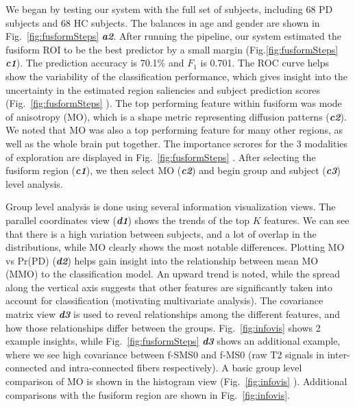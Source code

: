 We began by testing our system with the full set of subjects, including 68 PD subjects and 68 HC subjects. The balances in age and gender are shown in Fig.~\ref{fig:fusformSteps} \textbf{\textit{a2}}. After running the pipeline, our system estimated the fusiform ROI to be the best predictor by a small margin (Fig.\ref{fig:fusformSteps} \textbf{\textit{c1}}). The prediction accuracy is 70.1\% and $F_1$ is 0.701. The ROC curve helps show the variability of the classification performance, which gives insight into the uncertainty in the estimated region saliencies and subject prediction scores (Fig.~\ref{fig:fusformSteps} ). The top performing feature within fusiform was mode of anisotropy (MO), which is a shape metric representing diffusion patterns (\textbf{\textit{c2}}). We noted that MO was also a top performing feature for many other regions, as well as the whole brain put together. The importance scrores for the 3 modalities of exploration are displayed in Fig.~\ref{fig:fusformSteps} . After selecting the fusiform region (\textbf{\textit{c1}}), we then select MO (\textbf{\textit{c2}}) and begin group and subject (\textbf{\textit{c3}}) level analysis. 

Group level analysis is done using several information visualization views. The parallel coordinates view (\textbf{\textit{d1}}) shows the trends of the top $K$ features. We can see that there is a high variation between subjects, and a lot of overlap in the distributions, while MO clearly shows the most notable differences. Plotting MO vs Pr(PD) (\textbf{\textit{d2}}) helps gain insight into the relationship between mean MO (MMO) to the classification model. An upward trend is noted, while the spread along the vertical axis suggests that other features are significantly taken into account for classification (motivating multivariate analysis). The covariance matrix view \textbf{\textit{d3}} is used to reveal relationships among the different features, and how those relationships differ between the groups. Fig.~\ref{fig:infovis} shows 2 example insights, while Fig.~\ref{fig:fusformSteps} \textbf{\textit{d3}} shows an additional example, where we see high covariance between f-SMS0 and f-MS0 (raw T2 signals in inter-connected and intra-connected fibers respectively). A basic group level comparison of MO is shown in the histogram view (Fig.~\ref{fig:infovis} ). Additional comparisons with the fusiform region are shown in Fig.~\ref{fig:infovis}. 

